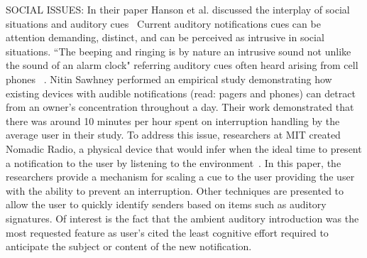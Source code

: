 SOCIAL ISSUES: In their paper Hanson et al. discussed the interplay of social
situations and auditory cues~\cite{hansson2001subtle} Current auditory
notifications cues can be attention demanding, distinct, and can be perceived as
intrusive in social situations. ``The beeping and ringing is by nature an
intrusive sound not unlike the sound of an alarm clock" referring auditory cues
often heard arising from cell phones  ~\cite{hansson2001subtle}.  Nitin Sawhney
performed an empirical study demonstrating how existing devices with audible
notifications (read: pagers and phones) can detract from an owner's
concentration throughout a day.  Their work demonstrated that there was around
10 minutes per hour spent on  interruption handling by the average user in their study.
To address this issue, researchers at MIT created Nomadic Radio, a physical
device that would infer when the ideal time to present a notification to the
user by listening to the environment~\cite{sawhney1999nomadic}. In this paper,
the researchers provide a mechanism for scaling a cue to the user providing
the user with the ability to prevent an interruption. Other techniques are
presented to allow the user to quickly identify senders based on items such as
auditory signatures.  Of interest is the fact that the ambient auditory
introduction was the most requested feature as user's cited the least cognitive
effort required to anticipate the subject or content of the new notification.

